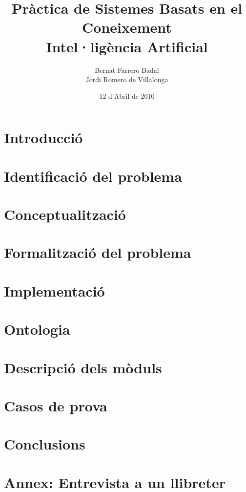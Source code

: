 \documentclass[a4paper]{report}
\author{Bernat Farrero Badal \\Jordi Romero de Villalonga}
\title{Pràctica de Sistemes Basats en el Coneixement \\ Intel·ligència Artificial}
\date{12 d'Abril de 2010}
\begin{document}
\maketitle

\tableofcontents

\newpage

\chapter{Introducció}


\chapter{Identificació del problema}


\chapter{Conceptualització}


\chapter{Formalització del problema}


\chapter{Implementació}


\chapter{Ontologia}



\chapter{Descripció dels mòduls}


\chapter{Casos de prova}


\chapter{Conclusions}


\chapter{Annex: Entrevista a un llibreter}

\end{document}
